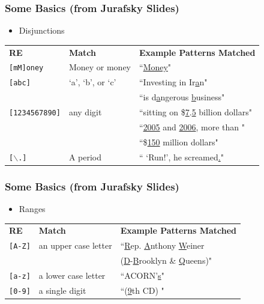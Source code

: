 \documentclass{beamer}
\begin{document}
\begin{frame}
\frametitle{Some Basics (from Jurafsky Slides) } 
\begin{itemize}
\item Disjunctions
\end{itemize}
\begin{center}
\scriptsize
\begin{tabular} {lll} 
\textbf{RE} & \textbf{Match} & \textbf{Example Patterns Matched}\\
{\tt [mM]oney } & Money or money  & ``\underline{Money}" \\
{\tt [abc] } & `a', `b', or `c'  & ``Investing in Ir\underline{a}n" \\
               &                              & ``is d\underline{a}ngerous \underline{b}usiness"\\
{\tt [1234567890]} & any digit &     ``sitting on \$\underline{7}.\underline{5} billion dollars"      \\
   &   & ``\underline{2}\underline{0}\underline{0}\underline{5} and \underline{2}\underline{0}\underline{0}\underline{6}, more than " \\
   &  &   ``\$\underline{1}\underline{5}\underline{0} million  dollars"    \\
{\tt [$\backslash$.] } & A period &`` `Run!', he screamed\underline{.}" 
\end{tabular}
\end{center}
\end{frame}

\begin{frame} 
\frametitle{Some Basics (from Jurafsky Slides) } 
\begin{itemize}
\item Ranges 
\end{itemize}
\begin{center}
\scriptsize
\begin{tabular} {lll} 
\textbf{RE} & \textbf{Match} & \textbf{Example Patterns Matched}\\
{\tt [A-Z]}  & an upper case letter   & ``\underline{R}ep. \underline{A}nthony \underline{W}einer\\
  &    &   (\underline{D}-\underline{B}rooklyn \& \underline{Q}ueens)" \\
{\tt [a-z]}  & a lower case letter &   ``ACORN'\underline{s}" \\
{\tt [0-9]}  & a single digit  & ``(\underline{9}th CD) " 
\end{tabular}
\end{center}
\end{frame}
\end{document}
